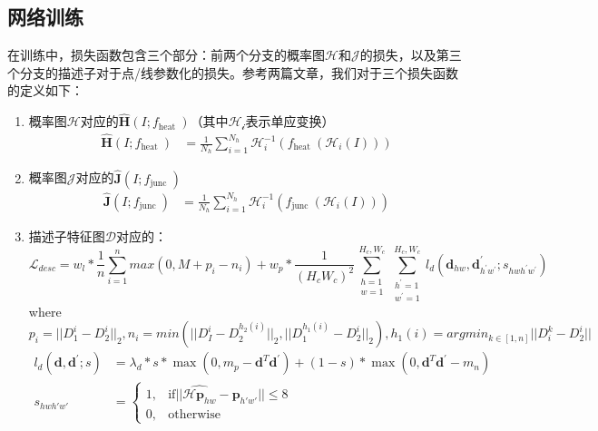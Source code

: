 \subsection{网络训练}
在训练中，损失函数包含三个部分：前两个分支的概率图$\mathcal{H}$和$\mathcal{J}$的损失，以及第三个分支的描述子对于点/线参数化的损失。参考两篇文章\cite{detone2018superpoint}\cite{pautrat2021sold2}，我们对于三个损失函数的定义如下：
\begin{enumerate}
  \item 概率图$\mathcal{H}$对应的$\hat{\mathbf{H}}\left(I ; f_{\text {heat }}\right)$（其中$\mathcal{H_i}$表示单应变换）
  \[\begin{aligned}
    \hat{\mathbf{H}}\left(I ; f_{\text {heat }}\right) & =\frac{1}{N_{h}} \sum_{i=1}^{N_{h}} \mathcal{H}_{i}^{-1}\left(f_{\text {heat }}\left(\mathcal{H}_{i}(I)\right)\right)
    \end{aligned}\]
  \item 概率图$\mathcal{J}$对应的$\hat{\mathbf{J}}\left(I ; f_{\text {junc }}\right)$
  \[\begin{aligned}
    \hat{\mathbf{J}}\left(I ; f_{\text {junc }}\right) & =\frac{1}{N_{h}} \sum_{i=1}^{N_{h}} \mathcal{H}_{i}^{-1}\left(f_{\text {junc }}\left(\mathcal{H}_{i}(I)\right)\right)
    \end{aligned}\]
  \item 描述子特征图$\mathcal{D}$对应的：
  \[
  \mathcal{L}_{desc}=w_l*\frac{1}{n}\sum^n_{i=1}
  max(0,M+p_i-n_i)+w_p*\frac{1}{\left(H_{c} W_{c}\right)^{2}} \sum_{\substack{h=1 \\
  w=1}}^{H_{c}, W_{c}} \sum_{\substack{h^{\prime}=1 \\
  w^{\prime}=1}}^{H_{c}, W_{c}} l_{d}\left(\mathbf{d}_{h w}, \mathbf{d}_{h^{\prime} w^{\prime}}^{\prime} ; s_{h w h^{\prime} w^{\prime}}\right)
  \]
  where
  \[
  p_i=||D_1^i-D_2^i||_2, n_i=min(||D_I^i-D_2^{h_2(i)}||_2,||D_1^{h_1(i)}-D_2^i||_2), h_1(i)=argmin_{k\in[1,n]}||D_i^k-D_2^i||
  \]
  \[\begin{aligned}
  l_{d}\left(\mathbf{d}, \mathbf{d}^{\prime} ; s\right)&=\lambda_{d} * s * \max \left(0, m_{p}-\mathbf{d}^{T} \mathbf{d}^{\prime}\right)+(1-s) * \max \left(0, \mathbf{d}^{T} \mathbf{d}^{\prime}-m_{n}\right)\\
  s_{hwh'w'}&=\begin{cases}1,&\text{if}||\widehat{\mathcal{H}\mathbf{p}_{hw}}-\mathbf{p}_{h'w'}||\le8\\0,&\text{otherwise}\end{cases}\\
  \end{aligned}\]
\end{enumerate}
